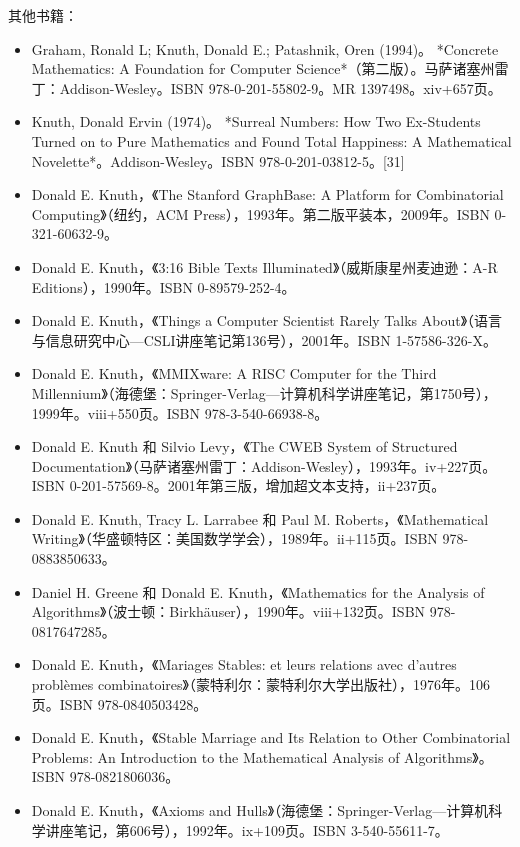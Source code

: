 其他书籍：
\begin{itemize}
\item Graham, Ronald L; Knuth, Donald E.; Patashnik, Oren (1994)。 *Concrete Mathematics: A Foundation for Computer Science*（第二版）。马萨诸塞州雷丁：Addison-Wesley。ISBN 978-0-201-55802-9。MR 1397498。xiv+657页。  
\item Knuth, Donald Ervin (1974)。 *Surreal Numbers: How Two Ex-Students Turned on to Pure Mathematics and Found Total Happiness: A Mathematical Novelette*。Addison-Wesley。ISBN 978-0-201-03812-5。[31]  
\item Donald E. Knuth，《The Stanford GraphBase: A Platform for Combinatorial Computing》（纽约，ACM Press），1993年。第二版平装本，2009年。ISBN 0-321-60632-9。  
\item Donald E. Knuth，《3:16 Bible Texts Illuminated》（威斯康星州麦迪逊：A-R Editions），1990年。ISBN 0-89579-252-4。  
\item Donald E. Knuth，《Things a Computer Scientist Rarely Talks About》（语言与信息研究中心—CSLI讲座笔记第136号），2001年。ISBN 1-57586-326-X。  
\item Donald E. Knuth，《MMIXware: A RISC Computer for the Third Millennium》（海德堡：Springer-Verlag—计算机科学讲座笔记，第1750号），1999年。viii+550页。ISBN 978-3-540-66938-8。  
\item Donald E. Knuth 和 Silvio Levy，《The CWEB System of Structured Documentation》（马萨诸塞州雷丁：Addison-Wesley），1993年。iv+227页。ISBN 0-201-57569-8。2001年第三版，增加超文本支持，ii+237页。  
\item Donald E. Knuth, Tracy L. Larrabee 和 Paul M. Roberts，《Mathematical Writing》（华盛顿特区：美国数学学会），1989年。ii+115页。ISBN 978-0883850633。  
\item Daniel H. Greene 和 Donald E. Knuth，《Mathematics for the Analysis of Algorithms》（波士顿：Birkhäuser），1990年。viii+132页。ISBN 978-0817647285。  
\item Donald E. Knuth，《Mariages Stables: et leurs relations avec d'autres problèmes combinatoires》（蒙特利尔：蒙特利尔大学出版社），1976年。106页。ISBN 978-0840503428。  
\item Donald E. Knuth，《Stable Marriage and Its Relation to Other Combinatorial Problems: An Introduction to the Mathematical Analysis of Algorithms》。ISBN 978-0821806036。  
\item Donald E. Knuth，《Axioms and Hulls》（海德堡：Springer-Verlag—计算机科学讲座笔记，第606号），1992年。ix+109页。ISBN 3-540-55611-7。
\end{itemize}
